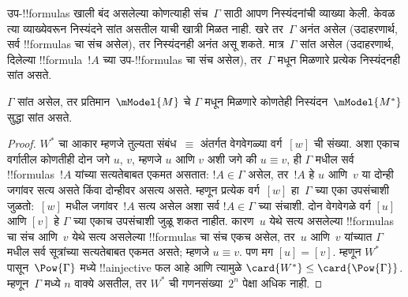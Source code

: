 \documentclass[../../../include/open-logic-section]{subfiles}
\begin{document}


उप-!!{formula}s खाली बंद असलेल्या कोणत्याही संच~$\Gamma$
साठी आपण निस्यंदनांची व्याख्या केली. केवळ त्या
व्याख्येवरून निस्यंदने सांत असतील याची खात्री मिळत नाही.
खरे तर~$\Gamma$ अनंत असेल (उदाहरणार्थ, सर्व
!!{formula}s चा संच असेल), तर निस्यंदनही अनंत असू शकते.
मात्र~$\Gamma$ सांत असेल (उदाहरणार्थ, दिलेल्या
!!{formula}~$!A$ च्या उप-!!{formula}s चा संच असेल),
तर~$\Gamma$ मधून मिळणारे प्रत्येक निस्यंदनही सांत असते.

\begin{prop}
  $\Gamma$ सांत असेल, तर प्रतिमान~$\mModel{M}$ चे
  $\Gamma$ मधून मिळणारे कोणतेही निस्यंदन~$\mModel{M^*}$
  सुद्धा सांत असते.
\end{prop}

\begin{proof}
  $W^*$ चा आकार म्हणजे तुल्यता संबंध~$\equiv$ अंतर्गत
  वेगवेगळ्या वर्ग~$[w]$ ची संख्या. अशा एकाच वर्गातील
  कोणतीही दोन जगे $u$, $v$, म्हणजे $u$ आणि $v$
  अशी जगे की $u \equiv v$, ही $\Gamma$ मधील सर्व !!{formula}s~$!A$
  यांच्या सत्यतेबाबत एकमत असतात: $!A \in \Gamma$ असेल,
  तर~$!A$ हे $u$ आणि~$v$ या दोन्ही जगांवर सत्य असते
  किंवा दोन्हीवर असत्य असते. म्हणून प्रत्येक वर्ग~$[w]$
  हा~$\Gamma$ च्या एका उपसंचाशी जुळतो:~$[w]$ मधील
  जगांवर~$!A$ सत्य असेल अशा सर्व $!A \in \Gamma$ च्या संचाशी.
  दोन वेगवेगळे वर्ग $[u]$ आणि $[v]$ हे $\Gamma$ च्या
  एकाच उपसंचाशी जुळू शकत नाहीत. कारण~$u$ येथे सत्य
  असलेल्या !!{formula}s चा संच आणि~$v$ येथे सत्य असलेल्या
  !!{formula}s चा संच एकच असेल, तर~$u$ आणि~$v$ यांच्यात
  $\Gamma$ मधील सर्व सूत्रांच्या सत्यतेबाबत एकमत असते;
  म्हणजे $u \equiv v$. पण मग $[u] = [v]$.
  म्हणून $W^*$ पासून~$\Pow{\Gamma}$ मध्ये !!a{injective}
  फल आहे आणि त्यामुळे $\card{W^*} \le \card{\Pow{\Gamma}}$.
  म्हणून~$\Gamma$ मध्ये $n$ वाक्ये असतील, तर
  $W^*$ ची गणनसंख्या~$2^n$ पेक्षा अधिक नाही.
\end{proof}
\end{document}
